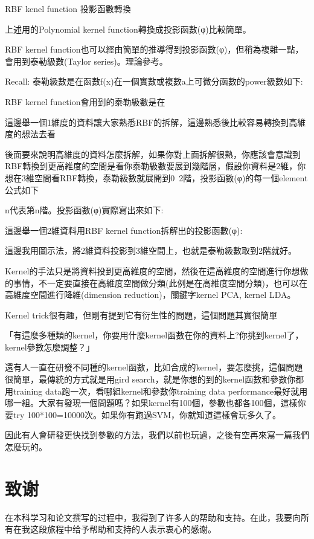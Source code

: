 \documentclass[12pt,a4paper]{amsart}
\begin{document}
RBF kenel function 投影函數轉換

上述用的Polynomial kernel function轉換成投影函數(φ)比較簡單。

RBF kernel function也可以經由簡單的推導得到投影函數(φ)，但稍為複雜一點，會用到泰勒級數(Taylor series)。理論參考。

Recall: 泰勒級數是在函數f(x)在一個實數或複數a上可微分函數的power級數如下:


RBF kernel function會用到的泰勒級數是在


這邊舉一個1維度的資料讓大家熟悉RBF的拆解，這邊熟悉後比較容易轉換到高維度的想法去看


後面要來說明高維度的資料怎麼拆解，如果你對上面拆解很熟，你應該會意識到RBF轉換到更高維度的空間是看你泰勒級數要展到幾階層，假設你資料是2維，你想在3維空間看RBF轉換，泰勒級數就展開到0~2階，投影函數(φ)的每一個element公式如下


n代表第n階。投影函數(φ)實際寫出來如下:


這邊舉一個2維資料用RBF kernel function拆解出的投影函數(φ):


這邊我用圖示法，將2維資料投影到3維空間上，也就是泰勒級數取到2階就好。



Kernel的手法只是將資料投到更高維度的空間，然後在這高維度的空間進行你想做的事情，不一定要直接在高維度空間做分類(此例是在高維度空間分類)，也可以在高維度空間進行降維(dimension reduction)，關鍵字kernel PCA, kernel LDA。

Kernel trick很有趣，但剛有提到它有衍生性的問題，這個問題其實很簡單

「有這麼多種類的kernel，你要用什麼kernel函數在你的資料上?你挑到kernel了，kernel參數怎麼調整？」

還有人一直在研發不同種的kernel函數，比如合成的kernel，要怎麼挑，這個問題很簡單，最傳統的方式就是用gird search，就是你想的到的kernel函數和參數你都用training data跑一次，看哪組kernel和參數你training data performance最好就用哪一組。大家有發現一個問題嗎？如果kernel有100個，參數也都各100個，這樣你要try 100*100=10000次。如果你有跑過SVM，你就知道這樣會玩多久了。

因此有人會研發更快找到參數的方法，我們以前也玩過，之後有空再來寫一篇我們怎麼玩的。

\section{致谢}

在本科学习和论文撰写的过程中，我得到了许多人的帮助和支持。在此，我要向所有在我这段旅程中给予帮助和支持的人表示衷心的感谢。\\
\end{document}
